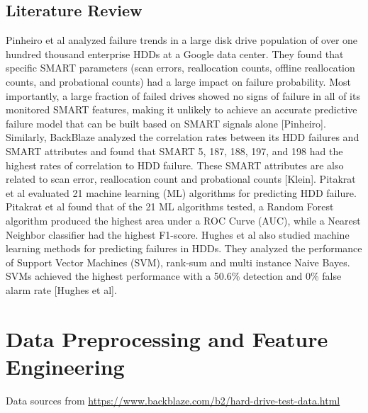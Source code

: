\documentclass[12pt,a4paper,english]{amsart}
\begin{document}
\subsection{Literature Review}

Pinheiro et al analyzed failure trends in a large disk drive population of over one hundred thousand enterprise HDDs at a Google data center. They found that specific SMART parameters (scan errors, reallocation counts, offline reallocation counts, and probational counts) had a large impact on failure probability. Most importantly, a large fraction of failed drives showed no signs of failure in all of its monitored SMART features, making it unlikely to achieve an accurate predictive failure model that can be built based on SMART signals alone [Pinheiro]. Similarly, BackBlaze analyzed the correlation rates between its HDD failures and SMART attributes and found that SMART 5, 187, 188, 197, and 198 had the highest rates of correlation to HDD failure. These SMART attributes are also related   to   scan   error,   reallocation   count   and   probational   counts   [Klein].
Pitakrat et al evaluated 21 machine learning (ML) algorithms for predicting HDD failure. Pitakrat et al found that of the 21 ML algorithms tested, a Random Forest algorithm produced the highest area under a ROC Curve (AUC), while   a   Nearest   Neighbor   classifier   had   the   highest   F1-score.
Hughes et al also studied machine learning methods for predicting failures in HDDs. They analyzed the performance of Support Vector Machines (SVM), rank-sum and multi instance Naive Bayes. SVMs achieved the highest   performance   with   a   50.6\%   detection   and   0\%   false   alarm   rate   [Hughes   et   al].

%
\section{Data Preprocessing and Feature Engineering}

Data sources from \url{https://www.backblaze.com/b2/hard-drive-test-data.html}
\end{document}
